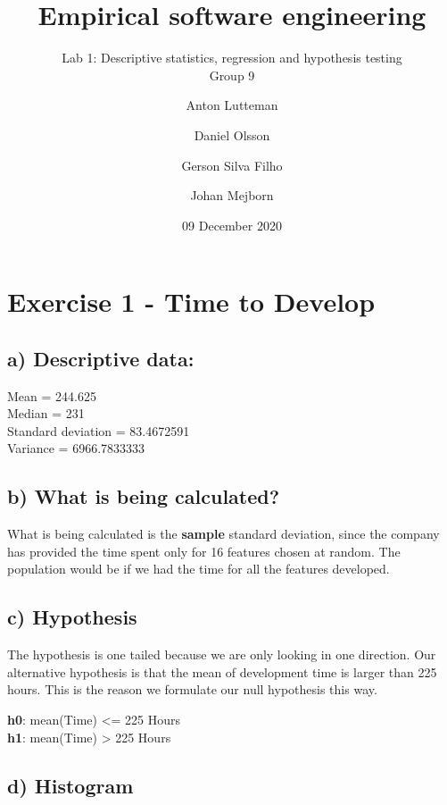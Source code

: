 \documentclass[
]{article}
\title{Empirical software engineering}
\subtitle{Lab 1: Descriptive statistics, regression and hypothesis testing\\
Group 9}
\author{Anton Lutteman \and Daniel Olsson \and Gerson Silva Filho \and Johan Mejborn}
\date{09 December 2020}
\begin{document}
\maketitle

\hypertarget{exercise-1---time-to-develop}{%
\section{Exercise 1 - Time to
Develop}\label{exercise-1---time-to-develop}}

\hypertarget{a-descriptive-data}{%
\subsection{a) Descriptive data:}\label{a-descriptive-data}}

Mean = 244.625\\
Median = 231\\
Standard deviation = 83.4672591\\
Variance = 6966.7833333\\

\hypertarget{b-what-is-being-calculated}{%
\subsection{b) What is being
calculated?}\label{b-what-is-being-calculated}}

What is being calculated is the \textbf{sample} standard deviation,
since the company has provided the time spent only for 16 features
chosen at random. The population would be if we had the time for all the
features developed.

\hypertarget{c-hypothesis}{%
\subsection{c) Hypothesis}\label{c-hypothesis}}

The hypothesis is one tailed because we are only looking in one
direction. Our alternative hypothesis is that the mean of development
time is larger than 225 hours. This is the reason we formulate our null
hypothesis this way.

\textbf{h0}: mean(Time) \textless= 225 Hours\\
\textbf{h1}: mean(Time) \textgreater{} 225 Hours

\hypertarget{d-histogram}{%
\subsection{d) Histogram}\label{d-histogram}}
\end{document}
